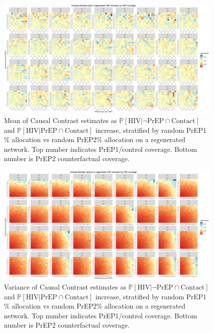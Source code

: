 \documentclass{article}
\theoremstyle{definition}
\begin{document}
\begin{figure}[H]
    \centering
    \includegraphics[width=\linewidth]{Figures/PrEP Regenerated Mean Plots.png}
    \caption{Mean of Causal Contrast estimates as $\mathbb{P}\left[\text{HIV} \vert \neg \text{PrEP} \cap \text{Contact}\right]$ and $\mathbb{P}\left[\text{HIV} \vert \text{PrEP} \cap \text{Contact}\right]$ increase, stratified by  random PrEP1 \% allocation vs random PrEP2\% allocation on a regenerated network. Top number indicates PrEP1/control coverage. Bottom number is PrEP2 counterfactual coverage.}
    \label{fig:Figure S4.15}
\end{figure}
\begin{figure}[H]
    \centering
    \includegraphics[width=\linewidth]{Figures/PrEP Regenerated Variance Plots.png}
    \caption{Variance of Causal Contrast estimates as $\mathbb{P}\left[\text{HIV} \vert \neg \text{PrEP} \cap \text{Contact}\right]$ and $\mathbb{P}\left[\text{HIV} \vert \text{PrEP} \cap \text{Contact}\right]$ increase, stratified by random PrEP1 \% allocation vs random PrEP2\% allocation on a regenerated network. Top number indicates PrEP1/control coverage. Bottom number is PrEP2 counterfactual coverage. }
    \label{fig:Figure S4.16}
\end{figure}
\end{document}
